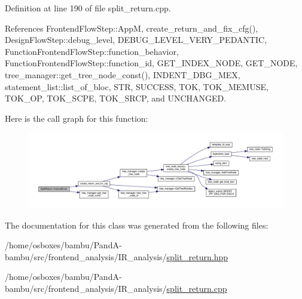 Definition at line 190 of file split\+\_\+return.\+cpp.



References Frontend\+Flow\+Step\+::\+AppM, create\+\_\+return\+\_\+and\+\_\+fix\+\_\+cfg(), Design\+Flow\+Step\+::debug\+\_\+level, D\+E\+B\+U\+G\+\_\+\+L\+E\+V\+E\+L\+\_\+\+V\+E\+R\+Y\+\_\+\+P\+E\+D\+A\+N\+T\+IC, Function\+Frontend\+Flow\+Step\+::function\+\_\+behavior, Function\+Frontend\+Flow\+Step\+::function\+\_\+id, G\+E\+T\+\_\+\+I\+N\+D\+E\+X\+\_\+\+N\+O\+DE, G\+E\+T\+\_\+\+N\+O\+DE, tree\+\_\+manager\+::get\+\_\+tree\+\_\+node\+\_\+const(), I\+N\+D\+E\+N\+T\+\_\+\+D\+B\+G\+\_\+\+M\+EX, statement\+\_\+list\+::list\+\_\+of\+\_\+bloc, S\+TR, S\+U\+C\+C\+E\+SS, T\+OK, T\+O\+K\+\_\+\+M\+E\+M\+U\+SE, T\+O\+K\+\_\+\+OP, T\+O\+K\+\_\+\+S\+C\+PE, T\+O\+K\+\_\+\+S\+R\+CP, and U\+N\+C\+H\+A\+N\+G\+ED.

Here is the call graph for this function\+:
\nopagebreak
\begin{figure}[H]
\begin{center}
\leavevmode
\includegraphics[width=350pt]{d1/d3d/classSplitReturn_a13e75f94bea3e3dfc28e026af60e49db_cgraph}
\end{center}
\end{figure}


The documentation for this class was generated from the following files\+:\begin{DoxyCompactItemize}
\item 
/home/osboxes/bambu/\+Pand\+A-\/bambu/src/frontend\+\_\+analysis/\+I\+R\+\_\+analysis/\hyperlink{split__return_8hpp}{split\+\_\+return.\+hpp}\item 
/home/osboxes/bambu/\+Pand\+A-\/bambu/src/frontend\+\_\+analysis/\+I\+R\+\_\+analysis/\hyperlink{split__return_8cpp}{split\+\_\+return.\+cpp}\end{DoxyCompactItemize}
